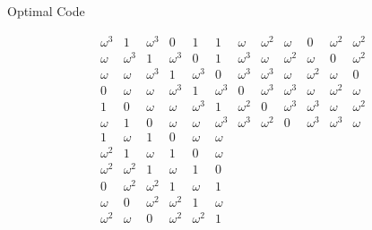 \documentclass{beamer}
\begin{document}
 \begin{frame}{Optimal Code}  
  
  \[
   \begin{array}{cccccc|cccccc}
\omega^3&1&\omega^3&0&1&1 & \omega&\omega^2&\omega&0&\omega^2&\omega^2\\
\omega&\omega^3&1&\omega^3&0&1 & \omega^3&\omega&\omega^2&\omega&0&\omega^2\\
\omega&\omega&\omega^3&1&\omega^3&0 & \omega^3&\omega^3&\omega&\omega^2&\omega&0\\
0&\omega&\omega&\omega^3&1&\omega^3 & 0&\omega^3&\omega^3&\omega&\omega^2&\omega\\
1&0&\omega&\omega&\omega^3&1 & \omega^2&0&\omega^3&\omega^3&\omega&\omega^2\\
\omega&1&0&\omega&\omega&\omega^3 & \omega^3&\omega^2&0&\omega^3&\omega^3&\omega\\ \hline
1&\omega&1&0&\omega&\omega & &&&&&\\
\omega^2&1&\omega&1&0&\omega & &&&&&\\
\omega^2&\omega^2&1&\omega&1&0 & &&&&&\\
0&\omega^2&\omega^2&1&\omega&1 & &&&&&\\
\omega&0&\omega^2&\omega^2&1&\omega & &&&&&\\
\omega^2&\omega&0&\omega^2&\omega^2&1 & &&&&&\\
   \end{array}
  \]

 \end{frame}
 
 
\end{document}
